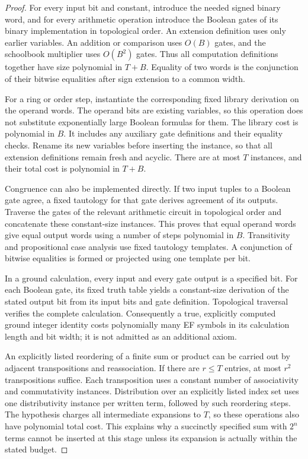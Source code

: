 \documentclass[11pt]{article}
\theoremstyle{definition}
\theoremstyle{remark}
\begin{document}
\begin{proof}
For every input bit and constant, introduce the needed signed binary
word, and for every arithmetic operation introduce the Boolean gates
of its binary implementation in topological order. An extension
definition uses only earlier variables. An addition or comparison
uses $O(B)$ gates, and the schoolbook multiplier uses $O(B^2)$ gates.
Thus all computation definitions together have size polynomial in
$T+B$. Equality of two words is the conjunction of their bitwise
equalities after sign extension to a common width.

For a ring or order step, instantiate the corresponding fixed library
derivation on the operand words. The operand bits are existing
variables, so this operation does not substitute exponentially large
Boolean formulas for them. The library cost is polynomial in $B$.
It includes any auxiliary gate definitions and their equality checks.
Rename its new variables before inserting the instance, so that all
extension definitions remain fresh and acyclic. There are at most $T$
instances, and their total cost is polynomial in $T+B$.

Congruence can also be implemented directly. If two input tuples to a
Boolean gate agree, a fixed tautology for that gate derives agreement
of its outputs. Traverse the gates of the relevant arithmetic circuit
in topological order and concatenate these constant-size instances.
This proves that equal operand words give equal output words using a
number of steps polynomial in $B$. Transitivity and propositional
case analysis use fixed tautology templates. A conjunction of bitwise
equalities is formed or projected using one template per bit.

In a ground calculation, every input and every gate output is a
specified bit. For each Boolean gate, its fixed truth table yields a
constant-size derivation of the stated output bit from its input bits
and gate definition. Topological traversal verifies the complete
calculation. Consequently a true, explicitly computed ground integer
identity costs polynomially many EF symbols in its calculation length
and bit width; it is not admitted as an additional axiom.

An explicitly listed reordering of a finite sum or product can be
carried out by adjacent transpositions and reassociation. If there
are $r\le T$ entries, at most $r^2$ transpositions suffice. Each
transposition uses a constant number of associativity and
commutativity instances. Distribution over an explicitly listed index
set uses one distributivity instance per written term, followed by
such reordering steps. The hypothesis charges all intermediate
expansions to $T$, so these operations also have polynomial total
cost. This explains why a succinctly specified sum with $2^n$ terms
cannot be inserted at this stage unless its expansion is actually
within the stated budget.


\end{proof}
\end{document}
